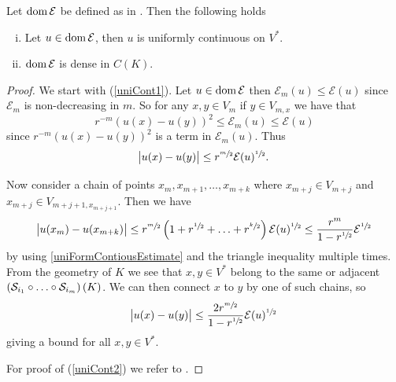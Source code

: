 \medskip
\begin{prop} Let $\operatorname{dom} \mathcal{E}$ be defined as in . Then the following holds
	\begin{enumerate}[(i)] 
		\item 	Let $u \in \operatorname{dom} \mathcal{E}$, then $u$ is uniformly continuous on $V^{*}$. \label{uniCont1}
		\item $\operatorname{dom} \mathcal{E}$ is dense in $C(K)$. \label{uniCont2}
	\end{enumerate}
\end{prop}
\begin{proof}
	We start with (\ref{uniCont1}). Let $u \in \operatorname{dom} \mathcal{E}$ then $\mathcal{E}_m(u) \leq \mathcal{E}(u)$ since $\mathcal{E}_m$ is non-decreasing in $m$. So for any $x,y \in V_m$ if $y \in V_{m,x}$ we have that
	\begin{equation}\label{uniFormContiousEstimate}
		r^{-m}(u(x) -u(y))^{2} \leq \mathcal{E}_m(u) \leq \mathcal{E}(u)
	\end{equation}
	since $r^{-m}(u(x) -u(y))^{2}$ is a term in $\mathcal{E}_m(u)$. Thus
	\begin{equation}
		\abs{u(x)-u(y)} \leq r^{\sfrac{m}{2}} \mathcal{E}(u)^{\sfrac{1}{2}}.
	\end{equation}
	
	Now consider a chain of points $x_m, x_{m+1}, \ldots, x_{m+k}$ where $x_{m+j} \in V_{m+j}$ and \\ $x_{m+j} \in V_{m+j+1, x_{m+j+1}}$. Then we have
	\begin{equation}
		\abs{u(x_m)-u(x_{m+k})} \leq r^{\sfrac{m}{2}}\left(1 + r^{\sfrac{1}{2}} + \ldots + r^{\sfrac{k}{2}}\right)\mathcal{E}(u)^{\sfrac{1}{2}} \leq \frac{r^{m}}{1-r^{\sfrac{1}{2}}} \mathcal{E}^{\sfrac{1}{2}}
	\end{equation}
	by using \eqref{uniFormContiousEstimate} and the triangle inequality multiple times. From the geometry of $K$ we see that $x, y \in V^{*}$ belong to the same or adjacent $\left(\mathcal{S}_{i_1} \circ \ldots \circ \mathcal{S}_{i_m}\right)(K)$. We can then connect $x$ to $y$ by one of such chains, so
	\begin{equation}
		\abs{u(x) - u(y)} \leq \frac{2r^{\sfrac{m}{2}}}{1-r^{\sfrac{1}{2}}} \mathcal{E}(u)^{\sfrac{1}{2}}
	\end{equation}
	giving a bound for all $x,y \in V^{*}$.
	
	For proof of (\ref{uniCont2}) we refer to \cite{strichartz}.
\end{proof}


